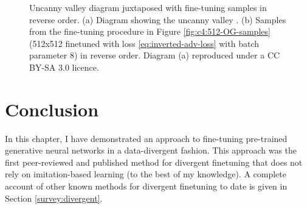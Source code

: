 \begin{figure}[!htbp]
  \centering
  \hfill
  \caption[Uncanny valley diagram juxtaposed with samples from fine-tuning process]{Uncanny valley diagram juxtaposed with fine-tuning samples in reverse order. (a) Diagram showing the uncanny valley \citep{mori1970uncanny}. (b) Samples from the fine-tuning procedure in Figure \ref{fig:c4:512-OG-samples} (512x512 finetuned with loss \ref{eq:inverted-adv-loss} with batch parameter 8) in reverse order. Diagram (a) reproduced under a CC BY-SA 3.0 licence. }
  \label{fig:c4:uncanny-valley-comparison}
\end{figure}

\section{Conclusion}

In this chapter, I have demonstrated an approach to fine-tuning pre-trained generative neural networks in a data-divergent fashion.
This approach was the first peer-reviewed and published method for divergent finetuning that does not rely on imitation-based learning (to the best of my knowledge).
A complete account of other known methods for divergent finetuning to date is given in Section \ref{survey:divergent}.

